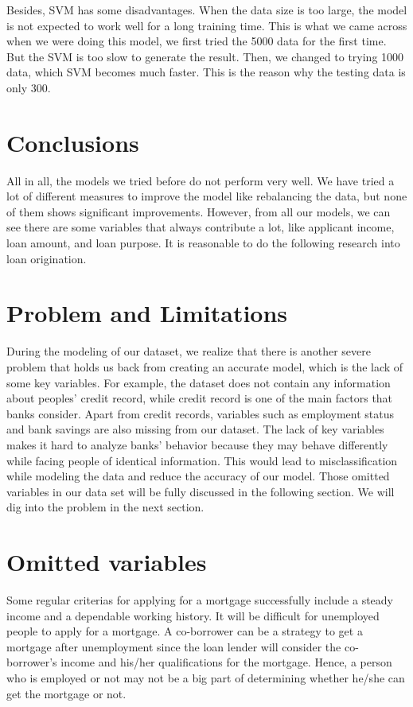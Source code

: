 \documentclass{jpp}
\begin{document}
Besides, SVM has some disadvantages. When the data size is too large, the model is not expected to work well for a long training time. This is what we came across when we were doing this model,  we first tried the 5000 data for the first time. But the SVM is too slow to generate the result. Then, we changed to trying 1000 data, which SVM becomes much faster. This is the reason why the testing data is only 300.  

\section{Conclusions}

All in all,  the models we tried before do not perform very well. We have tried a lot of different measures to improve the model like rebalancing the data, but none of them shows significant improvements. However, from all our models, we can see there are some variables that always contribute a lot, like applicant income, loan amount, and loan purpose. It is reasonable to do the following research into loan origination.

\section{Problem and Limitations}

During the modeling of our dataset, we realize that there is another severe problem that holds us back from creating an accurate model, which is the lack of some key variables. For example, the dataset does not contain any information about peoples’ credit record, while credit record is one of the main factors that banks consider. Apart from credit records, variables such as employment status and bank savings are also missing from our dataset. The lack of key variables makes it hard to analyze banks’ behavior because they may behave differently while facing people of identical information. This would lead to misclassification while modeling the data and reduce the accuracy of our model. Those omitted variables in our data set will be fully discussed in the following section. We will dig into the problem in the next section. 

\section{Omitted variables}

Some regular criterias for applying for a mortgage successfully include a steady income and a dependable working history. It will be difficult for unemployed people to apply for a mortgage. A co-borrower can be a strategy to get a mortgage after unemployment since the loan lender will consider the co-borrower's income and his/her qualifications for the mortgage. Hence, a person who is employed or not may not be a big part of determining whether he/she can get the mortgage or not. 
\end{document}
